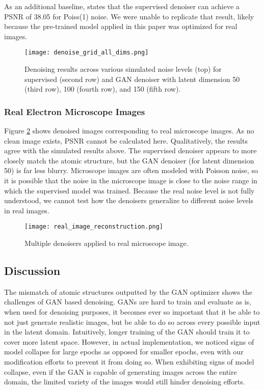 \documentclass{article}
\begin{document}
As an additional baseline, \cite{mohan_microscope} states that the supervised denoiser can achieve a PSNR of 38.05 for Poiss(1) noise. We were unable to replicate that result, likely because the pre-trained model applied in this paper was optimized for real images. 

\begin{figure}[h!]
  \centering
  \texttt{[image: denoise\_grid\_all\_dims.png]}
  \caption{Denoising results across various simulated noise levels (top) for supervised (second row) and GAN denoiser with latent dimension 50 (third row), 100 (fourth row), and 150 (fifth row).}
  \label{fig:den_grid}
\end{figure}

\subsubsection{Real Electron Microscope Images}

Figure \ref{fig:real_denoise} shows denoised images corresponding to real microscope images. As no clean image exists, PSNR cannot be calculated here. Qualitatively, the results agree with the simulated results above. The supervised denoiser appears to more closely match the atomic structure, but the GAN denoiser (for latent dimension 50) is far less blurry. Microscope images are often modeled with Poisson noise, so it is possible that the noise in the microscope image is close to the noise range in which the supervised model was trained. Because the real noise level is not fully understood, we cannot test how the denoisers generalize to different noise levels in real images.

\begin{figure}[h!]
  \centering
  \texttt{[image: real\_image\_reconstruction.png]}
  \caption{Multiple denoisers applied to real microscope image.}
  \label{fig:real_denoise}
\end{figure}


\subsection{Discussion} 

The mismatch of atomic structures outputted by the GAN optimizer shows the challenges of GAN based denoising. GANs are hard to train and evaluate as is, when used for denoising purposes, it becomes ever so important that it be able to not just generate realistic images, but be able to do so across every possible input in the latent domain. Intuitively, longer training of the GAN should train it to cover more latent space. However, in actual implementation, we noticed signs of model collapse for large epochs as opposed for smaller epochs, even with our modification efforts to prevent it from doing so. When exhibiting signs of model collapse, even if the GAN is capable of generating images across the entire domain, the limited variety of the images would still hinder denoising efforts. 
\end{document}

